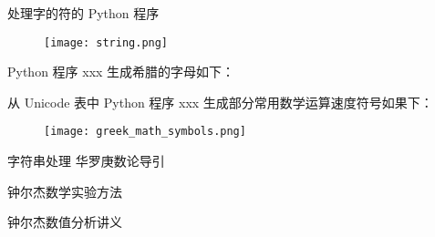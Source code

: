 \documentclass[main.tex]{subfiles}
\begin{document}
处理字的符的 Python 程序

\begin{figure}
	\texttt{[image: string.png]}
\end{figure}

Python 程序 xxx 生成希腊的字母如下：


从 Unicode 表中 Python 程序 xxx 生成部分常用数学运算速度符号如果下：

\newpage
\begin{figure}
	\texttt{[image: greek\_math\_symbols.png]}
\end{figure}


字符串处理
华罗庚数论导引
\cite[p.~1]{华罗庚数论导引}

钟尔杰数学实验方法 \cite{钟尔杰数学实验方法}

钟尔杰数值分析讲义 \cite{钟尔杰数值分析讲义}

\newpage
\end{document}
